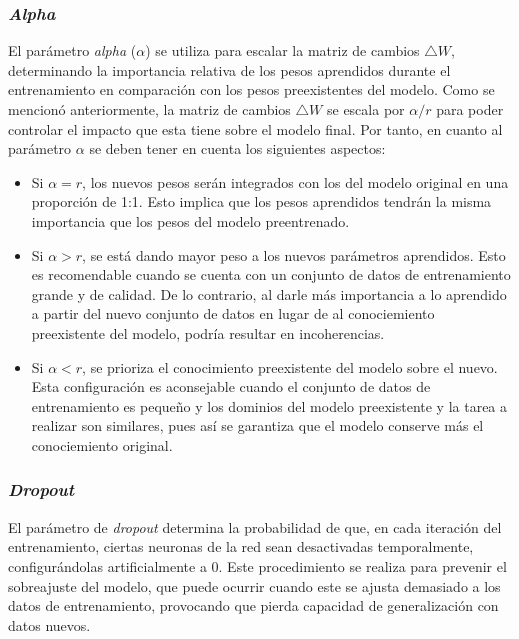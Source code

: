 \documentclass[11pt,spanish,listoffigures,listoftables]{tfgetsinf}
\begin{document}
\subsubsection{\textit{Alpha}}

El parámetro \textit{alpha} ($\alpha$) se utiliza para escalar la matriz de cambios $\bigtriangleup W$, determinando la importancia relativa de los pesos aprendidos durante el entrenamiento en comparación con los pesos preexistentes del modelo. Como se mencionó anteriormente, la matriz de cambios $\bigtriangleup W$ se escala por $\alpha / r$ para poder controlar el impacto que esta tiene sobre el modelo final. Por tanto, en cuanto al parámetro $\alpha$ se deben tener en cuenta los siguientes aspectos:

\begin{itemize}
	\item Si $\alpha = r$, los nuevos pesos serán integrados con los del modelo original en una proporción de 1:1. Esto implica que los pesos aprendidos tendrán la misma importancia que los pesos del modelo preentrenado.
	\item Si $\alpha > r$, se está dando mayor peso a los nuevos parámetros aprendidos. Esto es recomendable  cuando se cuenta con un conjunto de datos de entrenamiento grande y de calidad. De lo contrario, al darle más importancia a lo aprendido a partir del nuevo conjunto de datos en lugar de al conociemiento preexistente del modelo, podría resultar en incoherencias.
	\item Si $\alpha < r$, se prioriza el conocimiento preexistente del modelo sobre el nuevo. Esta configuración es aconsejable cuando el conjunto de datos de entrenamiento es pequeño y los dominios del modelo preexistente y la tarea a realizar son similares, pues así se garantiza que el modelo conserve más el conociemiento original.
\end{itemize}

\subsubsection{\textit{Dropout}}

El parámetro de \textit{dropout} determina la probabilidad de que, en cada iteración del entrenamiento, ciertas neuronas de la red sean desactivadas temporalmente, configurándolas artificialmente a 0. Este procedimiento se realiza para prevenir el sobreajuste del modelo, que puede ocurrir cuando este se ajusta demasiado a los datos de entrenamiento, provocando que pierda capacidad de generalización con datos nuevos.
\end{document}
